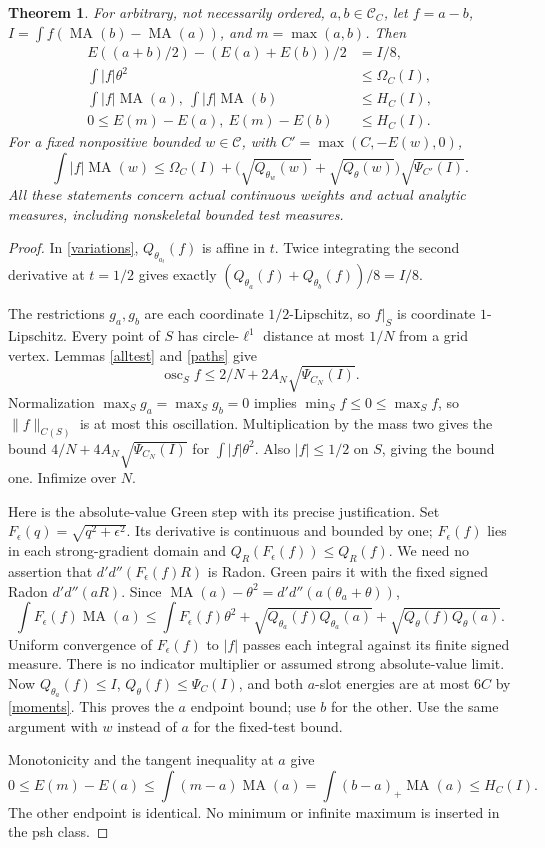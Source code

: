 \documentclass[11pt]{article}
\newcommand{\DD}{d'd''}
\newcommand{\MA}{\operatorname{MA}}
\newcommand{\C}{\mathcal C}
\newtheorem{theorem}{Theorem}
\theoremstyle{remark}\newtheorem{remark}[theorem]{Remark}
\begin{document}
\begin{theorem}\label{nonordered}
For arbitrary, not necessarily ordered, $a,b\in\C_C$, let
$f=a-b$, $I=\int f(\MA(b)-\MA(a))$, and $m=\max(a,b)$.
Then
\begin{align*}
 E((a+b)/2)-(E(a)+E(b))/2&=I/8,\\
 \int|f|\theta^2&\le\Omega_C(I),\\
 \int|f|\MA(a),\ \int|f|\MA(b)&\le H_C(I),\\
 0\le E(m)-E(a),\ E(m)-E(b)&\le H_C(I).
\end{align*}
For a fixed nonpositive bounded $w\in\C$, with $C'=\max(C,-E(w),0)$,
\[
 \int|f|\MA(w)\le\Omega_C(I)+
 \bigl(\sqrt{Q_{\theta_w}(w)}+\sqrt{Q_\theta(w)}\bigr)
              \sqrt{\Psi_{C'}(I)}.
\]
All these statements concern actual continuous weights and actual
analytic measures, including nonskeletal bounded test measures.
\end{theorem}
\begin{proof}
In \eqref{variations}, $Q_{\theta_{a_t}}(f)$ is affine in $t$.
Twice integrating the second derivative at $t=1/2$ gives exactly
$(Q_{\theta_a}(f)+Q_{\theta_b}(f))/8=I/8$.

The restrictions $g_a,g_b$ are each coordinate $1/2$-Lipschitz,
so $f|_S$ is coordinate $1$-Lipschitz. Every point of $S$ has
circle-$\ell^1$ distance at most $1/N$ from a grid vertex.
Lemmas \ref{alltest} and \ref{paths} give
\[
 \operatorname{osc}_S f\le2/N+2A_N\sqrt{\Psi_{C_N}(I)}.
\]
Normalization $\max_Sg_a=\max_Sg_b=0$ implies
$\min_Sf\le0\le\max_Sf$, so $\|f\|_{C(S)}$ is at most this
oscillation. Multiplication by the mass two gives the bound
$4/N+4A_N\sqrt{\Psi_{C_N}(I)}$ for $\int|f|\theta^2$.
Also $|f|\le1/2$ on $S$, giving the bound one. Infimize over $N$.

Here is the absolute-value Green step with its precise justification.
Set $F_\epsilon(q)=\sqrt{q^2+\epsilon^2}$. Its derivative is continuous
and bounded by one; $F_\epsilon(f)$ lies in each strong-gradient
domain and $Q_R(F_\epsilon(f))\le Q_R(f)$. We need no assertion
that $\DD(F_\epsilon(f)R)$ is Radon. Green pairs it with the fixed
signed Radon $\DD(aR)$. Since
$\MA(a)-\theta^2=\DD(a(\theta_a+\theta))$,
\[
 \int F_\epsilon(f)\MA(a)
 \le\int F_\epsilon(f)\theta^2+
 \sqrt{Q_{\theta_a}(f)Q_{\theta_a}(a)}+
 \sqrt{Q_\theta(f)Q_\theta(a)}.
\]
Uniform convergence of $F_\epsilon(f)$ to $|f|$ passes each
integral against its finite signed measure. There is no indicator
multiplier or assumed strong absolute-value limit.
Now $Q_{\theta_a}(f)\le I$, $Q_\theta(f)\le\Psi_C(I)$, and
both $a$-slot energies are at most $6C$ by \eqref{moments}.
This proves the $a$ endpoint bound; use $b$ for the other.
Use the same argument with $w$ instead of $a$ for the fixed-test bound.

Monotonicity and the tangent inequality at $a$ give
\[
 0\le E(m)-E(a)\le\int(m-a)\MA(a)
 =\int(b-a)_+\MA(a)\le H_C(I).
\]
The other endpoint is identical. No minimum or infinite maximum
is inserted in the psh class.
\end{proof}
\end{document}
